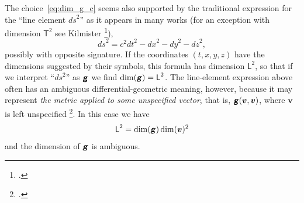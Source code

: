 \documentclass[\ifafour a4paper,12pt,\else a5paper,10pt,\fi%
onecolumn,oneside,article,%
british%
]{memoir}
\theoremstyle{remark}
\theoremstyle{innote}
\newcommand*{\mathte}[1]{\textbf{\textit{\textsf{#1}}}}
\newcommand*{\citep}{\footcites}
\renewcommand*{\|}[1][]{\nonscript\,#1\vert\nonscript\;\mathopen{}}
\newcommand*{\sect}{\S}%
\newcommand*{\chap}{ch.}%
\newcommand*{\cf}{{cf.}}
\newcommand*{\Le}{\textsf{L}}
\newcommand*{\Ti}{\textsf{T}}
\newcommand*{\yg}{\mathte{g}}
\newcommand*{\ygc}{\mathte{g}}
\newcommand*{\yv}{\bm{v}}
\newcommand*{\ds}{\mathit{ds}}
\begin{document}
The choice~\eqref{eq:dim_g_c} seems also supported by the traditional
expression for the \enquote{line element $\ds^{2}$} as it appears in many
works (for an exception with dimension $\Ti^{2}$ see Kilmister
\citep[\chap~II p.~25]{kilmister1973}{kilmister1973}),
\begin{equation}
  \label{eq:line_elem}
  \ds^{2} = c^2\mathit{dt}^2 - \mathit{dx}^2 -\mathit{dy}^2 - \mathit{dz}^2,
\end{equation}
possibly with opposite signature. If the
coordinates $(t,x,y,z)$ have the dimensions suggested by their symbols,
this formula has dimension $\Le^{2}$, so that if we interpret
\enquote{$\ds^{2}$} as $\ygc$ we find $\dim(\ygc) = \Le^{2}$. The
line-element expression above often has an ambiguous differential-geometric
meaning, however, because it may represent \emph{the metric applied to some
  unspecified vector}, that is, $\yg(\yv,\yv)$, where $\yv$ is left
unspecified \citep[\cf][Box~3.2~D p.~77]{misneretal1970_r1973}. In this
case we have
\begin{equation}
  \label{eq:line_elem_dim_ambiguous}
  \Le^{2} = \dim(\yg)\dim(\yv)^{2}
\end{equation}
and the dimension of $\yg$ is ambiguous.%

\medskip
\end{document}
